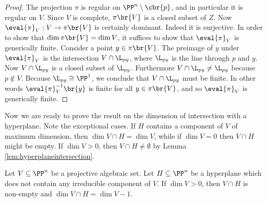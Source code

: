 \begin{proof}
The projection $ \pi $ is regular on $ \PP^n \setminus \cbr{p} $, and in particular it is regular on $ V $. Since $ V $ is complete, $ \pi\br{V} $ is a closed subset of $ Z $. Now $ \eval{\pi}_V : V \to \pi\br{V} $ is certainly dominant. Indeed it is surjective. In order to show that $ \dim \pi\br{V} = \dim V $, it suffices to show that $ \eval{\pi}_V $ is generically finite. Consider a point $ y \in \pi\br{V} $. The preimage of $ y $ under $ \eval{\pi}_V $ is the intersection $ V \cap \L_{py} $, where $ \L_{py} $ is the line through $ p $ and $ y $. Now $ V \cap \L_{py} $ is a closed subset of $ \L_{py} $. Furthermore $ V \cap \L_{py} \ne \L_{py} $ because $ p \notin V $. Because $ \L_{py} \cong \PP^1 $, we conclude that $ V \cap \L_{py} $ must be finite. In other words $ \eval{\pi}_V^{-1}\br{y} $ is finite for all $ y \in \pi\br{V} $, and so $ \eval{\pi}_V $ is generically finite.
\end{proof}

Now we are ready to prove the result on the dimension of intersection with a hyperplane. Note the exceptional cases. If $ H $ contains a component of $ V $ of maximum dimension, then $ \dim V \cap H = \dim V $, while if $ \dim V = 0 $ then $ V \cap H $ might be empty. If $ \dim V > 0 $, then $ V \cap H \ne \emptyset $ by Lemma \ref{lem:hyperplaneintersection}.

\begin{proposition}
\label{prop:hyperplanedimension}
Let $ V \subseteq \PP^n $ be a projective algebraic set. Let $ H \subseteq \PP^n $ be a hyperplane which does not contain any irreducible component of $ V $. If $ \dim V > 0 $, then $ V \cap H $ is non-empty and $ \dim V \cap H = \dim V - 1 $.
\end{proposition}

